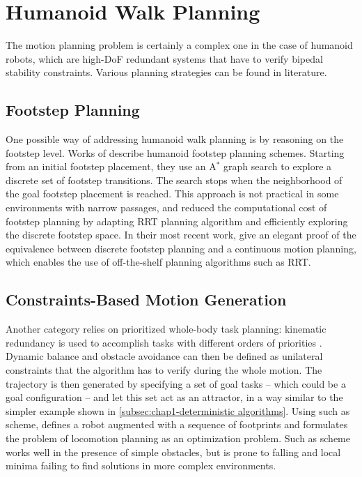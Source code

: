 \section{Humanoid Walk Planning}
\label{sec:chap1-humanoid-walk-planning}

The motion planning problem is certainly a complex one in the case of
humanoid robots, which are high-DoF redundant systems that have to
verify bipedal stability constraints. Various planning strategies can
be found in literature.

\subsection{Footstep Planning}
\label{subsec:chap1-footstep-planning}

One possible way of addressing humanoid walk planning is by reasoning
on the footstep level. Works of \cite{kuff01,ches05} describe humanoid
footstep planning schemes. Starting from an initial footstep
placement, they use an A$^{*}$ graph search \cite{hart68} to explore a
discrete set of footstep transitions. The search stops when the
neighborhood of the goal footstep placement is reached. This approach
is not practical in some environments with narrow passages, and
\cite{xia09, perr11a} reduced the computational cost of footstep
planning by adapting RRT planning algorithm and efficiently exploring
the discrete footstep space. In their most recent work, \cite{perr11b,
  perr12} give an elegant proof of the equivalence between discrete
footstep planning and a continuous motion planning, which enables the
use of off-the-shelf planning algorithms such as RRT.

\subsection{Constraints-Based Motion Generation}
\label{subsec:chap1-constraints-motion-generation}

Another category relies on prioritized whole-body task planning:
kinematic redundancy is used to accomplish tasks with different orders
of priorities \cite{khat04, saab-tro-12}. Dynamic balance and obstacle
avoidance can then be defined as unilateral constraints that the
algorithm has to verify during the whole motion. The trajectory is
then generated by specifying a set of goal tasks -- which could be a
goal configuration -- and let this set act as an attractor, in a way
similar to the simpler example shown in
\ref{subsec:chap1-deterministic algorithms}. Using such as scheme,
\cite{kano09} defines a robot augmented with a sequence of footprints
and formulates the problem of locomotion planning as an optimization
problem. Such as scheme works well in the presence of simple
obstacles, but is prone to falling and local minima failing to find
solutions in more complex environments.

